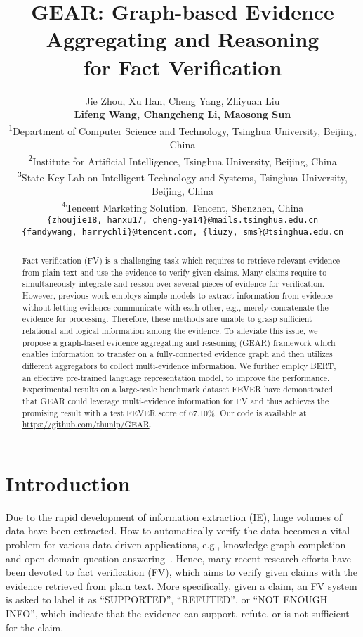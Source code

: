 \documentclass[11pt,a4paper]{article}
\title{GEAR: Graph-based Evidence Aggregating and Reasoning \\ for Fact Verification}
\author{Jie Zhou, Xu Han, Cheng Yang, Zhiyuan Liu \\ \textbf{Lifeng Wang, Changcheng Li, Maosong Sun}\\
\textsuperscript{1}Department of Computer Science and Technology, Tsinghua University, Beijing, China\\
\textsuperscript{2}Institute for Artificial Intelligence, Tsinghua University, Beijing, China\\
\textsuperscript{3}State Key Lab on Intelligent Technology and Systems, Tsinghua University, Beijing, China\\
\textsuperscript{4}Tencent Marketing Solution, Tencent, Shenzhen, China \\
\texttt{\{zhoujie18, hanxu17, cheng-ya14\}@mails.tsinghua.edu.cn} \\
\texttt{\{fandywang, harrychli\}@tencent.com, \{liuzy, sms\}@tsinghua.edu.cn}
}
\date{}
\begin{document}
\maketitle
\begin{abstract}
Fact verification (FV) is a challenging task which requires to retrieve relevant evidence from plain text and use the evidence to verify given claims. Many claims require to simultaneously integrate and reason over several pieces of evidence for verification. However, previous work employs simple models to extract information from evidence without letting evidence communicate with each other, e.g., merely concatenate the evidence for processing. Therefore, these methods are unable to grasp sufficient relational and logical information among the evidence. To alleviate this issue, we propose a graph-based evidence aggregating and reasoning (GEAR) framework which enables information to transfer on a fully-connected evidence graph and then utilizes different aggregators to collect multi-evidence information. We further employ BERT, an effective pre-trained language representation model, to improve the performance. Experimental results on a large-scale benchmark dataset FEVER have demonstrated that GEAR could leverage multi-evidence information for FV and thus achieves the promising result with a test FEVER score of 67.10\%. Our code is available at \url{https://github.com/thunlp/GEAR}.
\end{abstract}


\section{Introduction}
{\let\thefootnote\relax{}}

Due to the rapid development of information extraction (IE), huge volumes of data have been extracted. How to automatically verify the data becomes a vital problem for various data-driven applications, e.g., knowledge graph completion~\cite{wang2017knowledge} and open domain question answering~\cite{chen2017reading}. Hence, many recent research efforts have been devoted to fact verification (FV), which aims to verify given claims with the evidence retrieved from plain text. More specifically, given a claim, an FV system is asked to label it as ``SUPPORTED'', ``REFUTED'', or ``NOT ENOUGH INFO'', which indicate that the evidence can support, refute, or is not sufficient for the claim.
\end{document}
